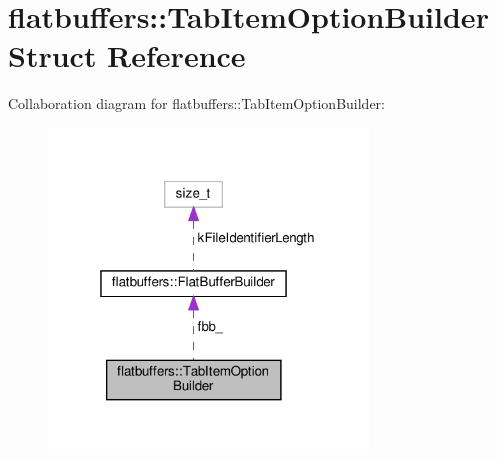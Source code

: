 \hypertarget{structflatbuffers_1_1TabItemOptionBuilder}{}\section{flatbuffers\+:\+:Tab\+Item\+Option\+Builder Struct Reference}
\label{structflatbuffers_1_1TabItemOptionBuilder}


Collaboration diagram for flatbuffers\+:\+:Tab\+Item\+Option\+Builder\+:
\nopagebreak
\begin{figure}[H]
\begin{center}
\leavevmode
\includegraphics[width=241pt]{structflatbuffers_1_1TabItemOptionBuilder__coll__graph}
\end{center}
\end{figure}

